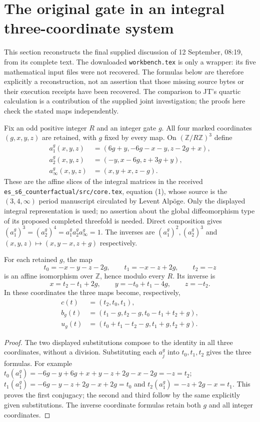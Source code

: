 \section{The original gate in an integral three-coordinate system}
This section reconstructs the final supplied discussion of 12 September,
08:19, from its complete text. The downloaded \texttt{workbench.tex} is only
a wrapper: its five mathematical input files were not recovered. The formulas
below are therefore explicitly a reconstruction, not an assertion that those
missing source bytes or their execution receipts have been recovered.
The comparison to JT's quartic calculation is a contribution of the supplied
joint investigation; the proofs here check the stated maps independently.

Fix an odd positive integer $R$ and an integer gate $g$. All four marked
coordinates $(g,x,y,z)$ are retained, with $g$ fixed by every map. On
$(\mathbb Z/R\mathbb Z)^3$ define
\begin{align*}
 a_1^g(x,y,z)&=(6g+y,-6g-x-y,z-2g+x),\\
 a_2^g(x,y,z)&=(-y,x-6g,z+3g+y),\\
 a_\infty^g(x,y,z)&=(x,y+x,z-g).
\end{align*}
These are the affine slices of the integral matrices in the received
\nolinkurl{es_s6_counterfactual/src/core.tex}, equation (1), whose source is
the $(3,4,\infty)$ period manuscript circulated by Levent Alp\"oge.
Only the displayed integral representation is used; no assertion about the
global diffeomorphism type of its proposed completed threefold is needed.
Direct composition gives
$(a_1^g)^3=(a_2^g)^4=a_1^ga_2^ga_\infty^g=1$.
The inverses are $(a_1^g)^2,(a_2^g)^3$ and
$(x,y,z)\mapsto(x,y-x,z+g)$ respectively.

\begin{proposition}
For each retained $g$, the map
\[
 t_0=-x-y-z-2g,\qquad t_1=-x-z+2g,\qquad t_2=-z
\]
is an affine isomorphism over $\mathbb Z$, hence modulo every $R$. Its inverse is
\[
 x=t_2-t_1+2g,\qquad y=-t_0+t_1-4g,\qquad z=-t_2.
\]
In these coordinates the three maps become, respectively,
\begin{align*}
 c(t)&=(t_2,t_0,t_1),\\
 b_g(t)&=(t_1-g,t_2-g,t_0-t_1+t_2+g),\\
 u_g(t)&=(t_0+t_1-t_2-g,t_1+g,t_2+g).
\end{align*}
\end{proposition}
\begin{proof}
The two displayed substitutions compose to the identity in all three
coordinates, without a division. Substituting each $a_j^g$ into $t_0,t_1,t_2$
gives the three formulas. For example
$t_0(a_1^g)=-6g-y+6g+x+y-z+2g-x-2g=-z=t_2$;
$t_1(a_1^g)=-6g-y-z+2g-x+2g=t_0$ and
$t_2(a_1^g)=-z+2g-x=t_1$. This proves the first conjugacy;
the second and third follow by the same explicitly given substitutions.
The inverse coordinate formulas retain both $g$ and all integer coordinates.
\end{proof}

